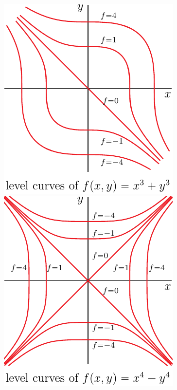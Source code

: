 \begin{efig}
\begin{center}
   \includegraphics{f3Level.pdf}\qquad
   \includegraphics{f4Level.pdf}\qquad
\end{center}
\end{efig}


